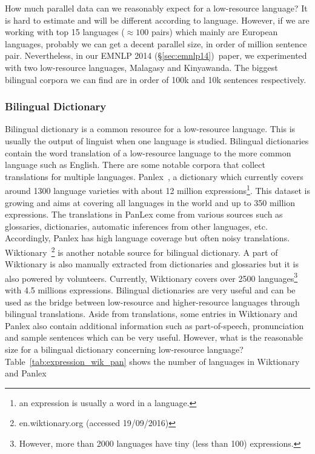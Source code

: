 \documentclass[12pt,twoside,final,hidelinks]{ltthesis}
\theoremstyle{definition}
\newcommand\emnlpiv{EMNLP 2014 (\S\ref{sec:emnlp14})}
\begin{document}
How much parallel data can we reasonably expect for a low-resource language? It is hard to 
estimate and will be different according to language. However, if we are working with top 15 
languages ($\approx100$ pairs) which mainly are European languages, probably we can get a 
decent parallel size, in order of million sentence pair. Nevertheless, in our \emnlpiv\ paper, 
we experimented with two low-resource languages, Malagasy and Kinyawanda. The biggest bilingual 
corpora we can find are in order of 100k and 10k sentences respectively.

\subsubsection{Bilingual Dictionary}
Bilingual dictionary is a common resource for a low-resource language. This is usually the output of linguist when one language is studied. Bilingual dictionaries contain the word translation of a low-resource language to the more common language such as English. 
There are some notable corpora that collect translations for multiple languages. 
Panlex~\cite{Kamholz14}, a dictionary which currently covers around 1300 language varieties with about 12 million expressions\footnote{an expression is usually a word in a language.}. This dataset is growing and aims at covering all languages in the world and up to 350 million expressions. 
The translations in PanLex come from various sources such as glossaries, dictionaries, automatic inferences from other languages, etc. 
Accordingly, Panlex has high language coverage but often noisy translations.
Wiktionary~\footnote{en.wiktionary.org (accessed 19/09/2016)} is another notable source for bilingual dictionary. A part of Wiktionary 
is also manually extracted from dictionaries and glossaries but it is also powered by 
volunteers. Currently, Wiktionary covers over 2500 languages\footnote{However, more than 2000 languages have tiny (less than 100) expressions.} with 4.5 millions expressions. 
Bilingual dictionaries are very useful and can be used as the bridge between low-resource and higher-resource languages through bilingual translations. Aside from translations, some entries in Wiktionary and Panlex also contain additional information such as part-of-speech, pronunciation and sample sentences which can be very useful. 
However, what is the reasonable size for a bilingual dictionary concerning low-resource language? 
Table~\ref{tab:expression_wik_pan} shows the number of languages in Wiktionary and Panlex 
\end{document}
